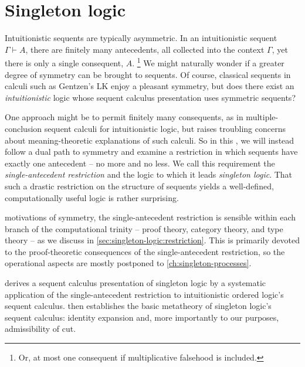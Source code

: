 \chapter{Singleton logic}\label{ch:singleton-logic}

Intuitionistic sequents are typically asymmetric.
In an intuitionistic sequent $\Gamma \vdash A$, there are finitely many antecedents, all collected into the context $\Gamma$, yet there is only a single consequent, $A$.%
\footnote{Or, at most one consequent if multiplicative falsehood is included.}
We might naturally wonder if a greater degree of symmetry can be brought to sequents.
Of course, classical sequents in calculi such as Gentzen's LK\autocite{Gentzen:??} enjoy a pleasant symmetry, but does there exist an \emph{intuitionistic} logic whose sequent calculus presentation uses symmetric sequents?

One approach might be to permit finitely many consequents, as in multiple-conclusion sequent calculi for intuitionistic logic\autocite{??}, but \textcite{Steinberger:JPL11} raises troubling concerns about meaning-theoretic explanations of such calculi.
So in this , we will instead follow a dual path to symmetry and examine a restriction in which sequents have exactly one antecedent -- no more and no less.
We call this requirement the \emph{single-antecedent restriction} and the logic to which it leads \emph{singleton logic}.
That such a drastic restriction on the structure of sequents yields a well-defined, computationally useful logic is rather surprising.

 motivations of symmetry, the single-antecedent restriction is sensible within each branch of the computational trinity\autocite{Harper:??} -- proof theory, category theory, and type theory -- as we discuss in \cref{sec:singleton-logic:restriction}.
This  is primarily devoted to the proof-theoretic consequences of the single-antecedent restriction, so the operational aspects are mostly postponed to \cref{ch:singleton-processes}.

 derives a sequent calculus presentation of singleton logic by a systematic application of the single-antecedent restriction to intuitionistic ordered logic's sequent calculus.
 then establishes the basic metatheory of singleton logic's sequent calculus: identity expansion and, more importantly to our purposes, admissibility of cut.

